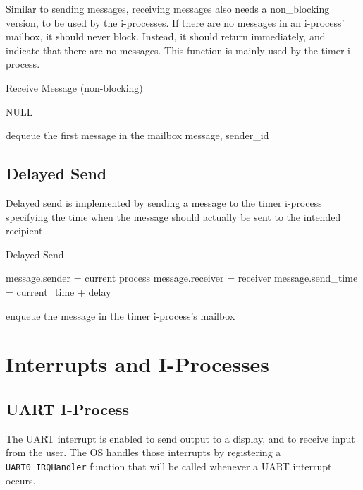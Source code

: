 \documentclass[12pt]{report}
\begin{document}
Similar to sending messages, receiving messages also needs a non_blocking version, to be used by the i-processes. If there are no messages in an i-process' mailbox, it should never block. Instead, it should return immediately, and indicate that there are no messages. This function is mainly used by the timer i-process.

\begin{algorithm}[H]
	\caption{Receive Message (non-blocking)}
	\begin{algorithmic}[1]
				\State\Return NULL
			\EndIf

			\State dequeue the first message in the mailbox
			\State\Return message, sender_id
		\EndFunction
	\end{algorithmic}
\end{algorithm}


\subsection{Delayed Send}

Delayed send is implemented by sending a message to the timer i-process specifying the time when the message should actually be sent to the intended recipient.

\begin{algorithm}[H]
	\caption{Delayed Send}
	\begin{algorithmic}[1]
			\State message.sender = current process
			\State message.receiver = receiver
			\State message.send_time = current_time + delay

			\State enqueue the message in the timer i-process's mailbox 
		\EndFunction
	\end{algorithmic}
\end{algorithm}


\section{Interrupts and I-Processes}

\subsection{UART I-Process}

The UART interrupt is enabled to send output to a display, and to receive input from the user. The OS handles those interrupts by registering a \texttt{UART0_IRQHandler} function that will be called whenever a UART interrupt occurs.
\end{document}
